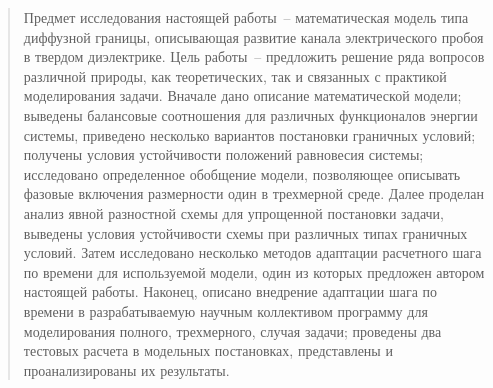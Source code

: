 \documentclass[a4paper,12pt]{article}
\theoremstyle{plain}
\theoremstyle{remark}
\newcommand{\customtitle}{%
    \begin{center}
        \singlespacing \Large
        Теоретические и численные вопросы моделирования \\ развития канала электрического пробоя \\ методом диффузной границы
    \end{center}
    \vspace{-5mm}
    \hspace{8cm}
    \begin{minipage}{6cm}
        \singlespacing
        Пономарев Андрей Сергеевич \\[2mm]
        Научный руководитель: \\
        Савенков Евгений Борисович
    \end{minipage}
    \begin{center}
        \today
    \end{center}
}
\begin{document}


\setcounter{page}{2}
\begin{abstract}
    \noindent \normalsize
    Предмет исследования настоящей работы~-- математическая модель типа диффузной границы, описывающая развитие канала электрического пробоя в твердом диэлектрике. Цель работы~-- предложить решение ряда вопросов различной природы, как теоретических, так и связанных с практикой моделирования задачи. Вначале дано описание математической модели; выведены балансовые соотношения для различных функционалов энергии системы, приведено несколько вариантов постановки граничных условий; получены условия устойчивости положений равновесия системы; исследовано определенное обобщение модели, позволяющее описывать фазовые включения размерности один в трехмерной среде. Далее проделан анализ явной разностной схемы для упрощенной постановки задачи, выведены условия устойчивости схемы при различных типах граничных условий. Затем исследовано несколько методов адаптации расчетного шага по времени для используемой модели, один из которых предложен автором настоящей работы. Наконец, описано внедрение адаптации шага по времени в разрабатываемую научным коллективом программу для моделирования полного, трехмерного, случая задачи; проведены два тестовых расчета в модельных постановках, представлены и проанализированы их результаты.
\end{abstract}
\clearpage

\begin{spacing}{1.2}
    \tableofcontents
\end{spacing}

















\clearpage
\printbibliography[
    heading=bibintoc,
    title={ИСПОЛЬЗОВАННЫЕ ИСТОЧНИКИ}
]
\end{document}
